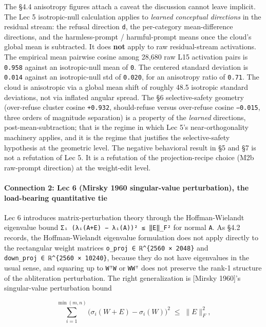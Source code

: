 \documentclass[
  11pt,
]{article}
\begin{document}
The §4.4 anisotropy figures attach a caveat the discussion cannot leave
implicit. The Lec 5 isotropic-null calculation applies to \emph{learned
conceptual directions} in the residual stream: the refusal direction
\texttt{d}, the per-category mean-difference directions, and the
harmless-prompt / harmful-prompt means once the cloud's global mean is
subtracted. It does \textbf{not} apply to raw residual-stream
activations. The empirical mean pairwise cosine among 28,680 raw L15
activation pairs is \texttt{0.958} against an isotropic-null mean of
\texttt{0}. The centered standard deviation is \texttt{0.014} against an
isotropic-null std of \texttt{0.020}, for an anisotropy ratio of
\texttt{0.71}. The cloud is anisotropic via a global mean shift of
roughly 48.5 isotropic standard deviations, not via inflated angular
spread. The §6 selective-safety geometry (over-refuse cluster cosine
\texttt{+0.932}, should-refuse versus over-refuse cosine
\texttt{−0.015}, three orders of magnitude separation) is a property of
the \emph{learned} directions, post-mean-subtraction; that is the regime
in which Lec 5's near-orthogonality machinery applies, and it is the
regime that justifies the selective-safety hypothesis at the geometric
level. The negative behavioral result in §5 and §7 is not a refutation
of Lec 5. It is a refutation of the projection-recipe choice (M2b
raw-prompt direction) at the weight-edit level.

\paragraph{Connection 2: Lec 6 (Mirsky 1960 singular-value
perturbation), the load-bearing quantitative
tie}\label{connection-2-lec-6-mirsky-1960-singular-value-perturbation-the-load-bearing-quantitative-tie}

Lec 6 introduces matrix-perturbation theory through the Hoffman-Wielandt
eigenvalue bound \texttt{Σᵢ\ (λᵢ(A+E)\ −\ λᵢ(A))²\ ≤\ ‖E‖\_F²} for
normal \texttt{A}. As §4.2 records, the Hoffman-Wielandt eigenvalue
formulation does not apply directly to the rectangular weight matrices
\texttt{o\_proj\ ∈\ ℝ\^{}\{2560\ ×\ 2048\}} and
\texttt{down\_proj\ ∈\ ℝ\^{}\{2560\ ×\ 10240\}}, because they do not
have eigenvalues in the usual sense, and squaring up to \texttt{WᵀW} or
\texttt{WWᵀ} does not preserve the rank-1 structure of the abliteration
perturbation. The right generalization is {[}Mirsky 1960{]}'s
singular-value perturbation bound

\[ \sum_{i=1}^{\min(m, n)} \bigl(\sigma_i(W + E) - \sigma_i(W)\bigr)^2 \;\le\; \|E\|_F^2, \]
\end{document}
